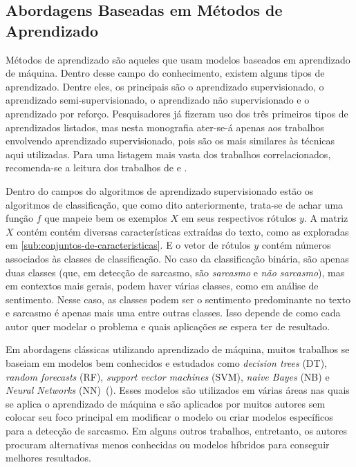 \subsection{Abordagens Baseadas em Métodos de Aprendizado}%
\label{sub:abordagens_baseadas_em_metodos_de_aprendizado}

Métodos de aprendizado são aqueles que usam modelos baseados em aprendizado de
máquina. Dentro desse campo do conhecimento, existem alguns tipos de
aprendizado. Dentre eles, os principais são o aprendizado supervisionado, o
aprendizado semi-supervisionado, o aprendizado não supervisionado e o
aprendizado por reforço. Pesquisadores já fizeram uso dos três primeiros tipos
de aprendizados listados, mas nesta monografia ater-se-á apenas aos trabalhos
envolvendo aprendizado supervisionado, pois são os mais similares às técnicas
aqui utilizadas. Para uma listagem mais vasta dos trabalhos correlacionados,
recomenda-se a leitura dos trabalhos de
\cite{joshi:2017:sarcasm-detection-survey} e
\cite{yaghoobian:2021:sarcasm-detection-comparative-study}.

Dentro do campos do algoritmos de aprendizado supervisionado estão os algoritmos
de classificação, que como dito anteriormente, trata-se de achar uma função $f$
que mapeie bem os exemplos $X$ em seus respectivos rótulos $y$. A matriz $X$
contém contém diversas características extraídas do texto, como as exploradas em
\ref{sub:conjuntos-de-caracteristicas}. E o vetor de rótulos $y$ contém números
associados às classes de classificação. No caso da classificação binária, são
apenas duas classes (que, em detecção de sarcasmo, são \textit{sarcasmo} e
\textit{não sarcasmo}), mas em contextos mais gerais, podem haver várias
classes, como em análise de sentimento. Nesse caso, as classes podem ser o
sentimento predominante no texto e sarcasmo é apenas mais uma entre outras
classes. Isso depende de como cada autor quer modelar o problema e quais
aplicações se espera ter de resultado.

Em abordagens clássicas utilizando aprendizado de máquina, muitos trabalhos se
baseiam em modelos bem conhecidos e estudados como \textit{decision trees} (DT),
\textit{random forecasts} (RF), \textit{support vector machines} (SVM),
\textit{naive Bayes} (NB) e \textit{Neural Networks}
(NN)~(\cite{yaghoobian:2021:sarcasm-detection-comparative-study}). Esses modelos
são utilizados em várias áreas nas quais se aplica o aprendizado de máquina e
são aplicados por muitos autores sem colocar seu foco principal em modificar o
modelo ou criar modelos específicos para a detecção de sarcasmo. Em alguns
outros trabalhos, entretanto, os autores procuram alternativas menos conhecidas
ou modelos híbridos para conseguir melhores resultados.

